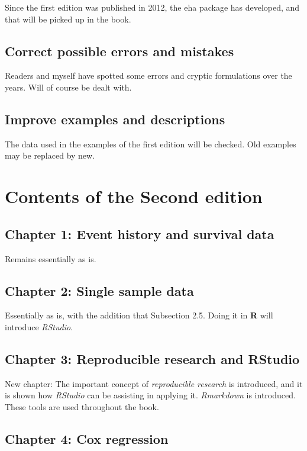\documentclass[a4paper,11pt]{article}
\begin{document}
Since the first edition was published in 2012, the eha package has
developed, and that will be picked up in the book.

\subsection{Correct possible errors and mistakes}

Readers and myself have spotted some errors and cryptic formulations over
the years. Will of course be dealt with.

\subsection{Improve examples and descriptions}

The data used in the examples of the first edition will be checked. Old
examples may be replaced by new.  

\section{Contents of the Second edition} \label{sec:contents}

\subsection*{Chapter 1: Event history and survival data}

Remains essentially as is.

\subsection*{Chapter 2: Single sample data}

Essentially as is, with the addition that Subsection 2.5. Doing it in {\bf
  R} will introduce \emph{RStudio}.

\subsection*{Chapter 3: Reproducible research and RStudio}

New chapter: The important concept of \emph{reproducible research} is
introduced, and it is shown how \emph{RStudio} can be assisting in applying
it. \emph{Rmarkdown} is introduced. These tools are used throughout the
book.

\subsection*{Chapter 4: Cox regression}
\end{document}
